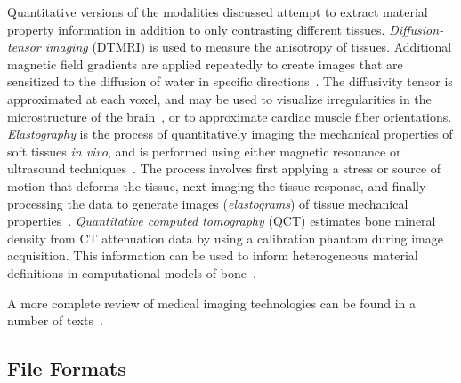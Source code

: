 Quantitative versions of the modalities discussed attempt to extract material property information in addition to only contrasting different tissues. \textit{Diffusion-tensor imaging} (DTMRI) is used to measure the anisotropy of tissues. Additional magnetic field gradients are applied repeatedly to create images that are sensitized to the diffusion of water in specific directions~\cite{o'donnell_westin_2011}. The diffusivity tensor is approximated at each voxel, and may be used to visualize irregularities in the microstructure of the brain~\cite{alexander_lee_lazar_field_2007}, or to approximate cardiac muscle fiber orientations. \textit{Elastography} is the process of quantitatively imaging the mechanical properties of soft tissues \textit{in vivo}, and is performed using either magnetic resonance or ultrasound techniques~\cite{zaleska_2014}. The process involves first applying a stress or source of motion that deforms the tissue, next imaging the tissue response, and finally processing the data to generate images (\textit{elastograms}) of tissue mechanical properties~\cite{glaser_manduca_ehman_2012}. \textit{Quantitative computed tomography} (QCT) estimates bone mineral density from CT attenuation data by using a calibration phantom during image acquisition. This information can be used to inform heterogeneous material definitions in computational models of bone~\cite{knowles_2016}.

A more complete review of medical imaging technologies can be found in a number of texts~\cite{webb_2003, suetens_2017}.

\subsection{File Formats}
\label{Data Format-IMG}

